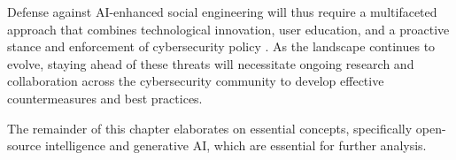 %
%
Defense against AI-enhanced social engineering will thus require a multifaceted approach that combines technological innovation, user education, and a proactive stance and enforcement of cybersecurity policy \citep{blauth_AI_Crime_Overview_Malicious_Use_Abuse_2022}. As the landscape continues to evolve, staying ahead of these threats will necessitate ongoing research and collaboration across the cybersecurity community to develop effective countermeasures and best practices.







The remainder of this chapter elaborates on essential concepts, specifically open-source intelligence and generative AI, which are essential for further analysis.












